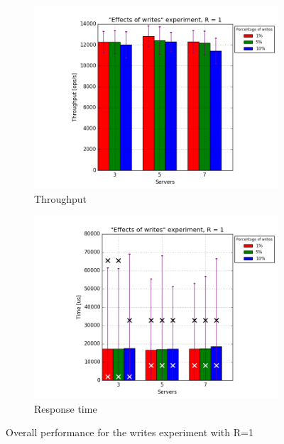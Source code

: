 \documentclass[11pt]{article}
\begin{document}
\begin{figure}
\centering
\begin{subfigure}{.5\textwidth}
	\centering
	\includegraphics[width=\linewidth]{plots/writes-1-replication}
	\caption{Throughput}
	\label{fig:writes-throughput-1}
\end{subfigure}%
\begin{subfigure}{.5\textwidth}
	\centering
	\includegraphics[width=\linewidth]{plots/writes-response_time-1-replication}
	\caption{Response time}
	\label{fig:writes-reponse-time-1}
\end{subfigure}
\caption{Overall performance for the writes experiment with R=1}
\label{fig:writes-overall}
\end{figure}
\end{document}
